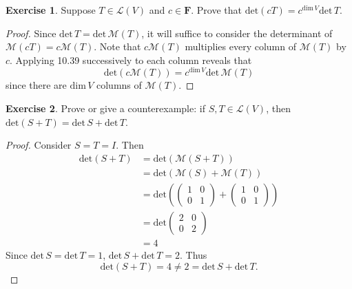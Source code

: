 \documentclass{article}
\theoremstyle{definition}
\newtheorem{ex}{Exercise}
\begin{document}
\begin{ex}
	Suppose $T \in \mathcal{L}(V)$ and $c \in \mathbf{F}$.
	Prove that $\mathrm{det}(cT) = c^{\mathrm{dim}\,V}\mathrm{det}\,T$.
\end{ex}
\begin{proof}
	Since $\mathrm{det}\,T = \mathrm{det}\,\mathcal{M}(T)$, it will suffice to consider the determinant of $\mathcal{M}(cT) = c \mathcal{M}(T)$.
	Note that $c \mathcal{M}(T)$ multiplies every column of $\mathcal{M}(T)$ by $c$.
	Applying 10.39 successively to each column reveals that \begin{equation*}
		\mathrm{det}(c\mathcal{M}(T)) = c^{\mathrm{dim}\,V}\mathrm{det}\,\mathcal{M}(T)
	\end{equation*}
	since there are $\mathrm{dim}\,V$ columns of $\mathcal{M}(T)$.
\end{proof}

\begin{ex}
	Prove or give a counterexample: if $S, T \in \mathcal{L}(V)$, then $\mathrm{det}(S + T) = \mathrm{det}\,S + \mathrm{det}\,T$.
\end{ex}
\begin{proof}
	Consider $S = T = I$.
	Then \begin{align*}
		\mathrm{det}(S + T) & = \mathrm{det}(\mathcal{M}(S + T))                       \\
		                    & = \mathrm{det}(\mathcal{M}(S) + \mathcal{M}(T))          \\
		                    & = \mathrm{det}\left(\begin{pmatrix}
				                                          1 & 0 \\
				                                          0 & 1
			                                          \end{pmatrix} + \begin{pmatrix}
				                                                          1 & 0 \\
				                                                          0 & 1
			                                                          \end{pmatrix}\right) \\
		                    & = \mathrm{det}\begin{pmatrix}
			                                    2 & 0 \\
			                                    0 & 2
		                                    \end{pmatrix}                             \\
		                    & = 4
	\end{align*}
	Since $\mathrm{det}\,S = \mathrm{det}\,T = 1$, $\mathrm{det}\,S + \mathrm{det}\,T = 2$.
	Thus \begin{equation*}
		\mathrm{det}(S + T) = 4 \neq 2 = \mathrm{det}\,S + \mathrm{det}\,T.
	\end{equation*}
\end{proof}
\end{document}
